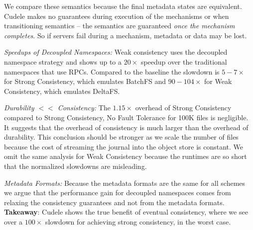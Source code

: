 We compare these semantics because the final metadata states are equivalent.
Cudele makes no guarantees during execution of the mechanisms or when
transitioning semantics -- the semantics are guaranteed {\it once the mechanism
completes}. So if servers fail during a mechanism, metadata or data may be
lost.

{\it Speedups of Decoupled Namespaces:} Weak consistency uses the
decoupled namespace strategy and shows up to a \(20\times\) speedup over the
traditional namespaces that use RPCs. Compared to the baseline the slowdown is
\(5-7\times\) for Strong Consistency, which emulates BatchFS and
\(90-104\times\) for Weak Consistency, which emulates DeltaFS.

{\it Durability \(<<\) Consistency:} The \(1.15\times\) overhead of
Strong Consistency compared to Strong Consistency, No Fault Tolerance for
100K files is negligible. It suggests that the overhead of consistency is much
larger than the overhead of durability. This conclusion should be stronger as
we scale the number of files because the cost of streaming the journal into the
object store is constant. We omit the same analysis for Weak Consistency
because the runtimes are so short that the normalized slowdowns are misleading.

{\it Metadata Formats:} Because the metadata formats are the same for
all schemes we argue that the performance gain for decoupled namespaces comes
from relaxing the consistency guarantees and not from the metadata formats.\\

\noindent\textbf{Takeaway}: Cudele shows the true benefit of eventual
consistency, where we see over a \(100\times\) slowdown for achieving strong
consistency, in the worst case.

